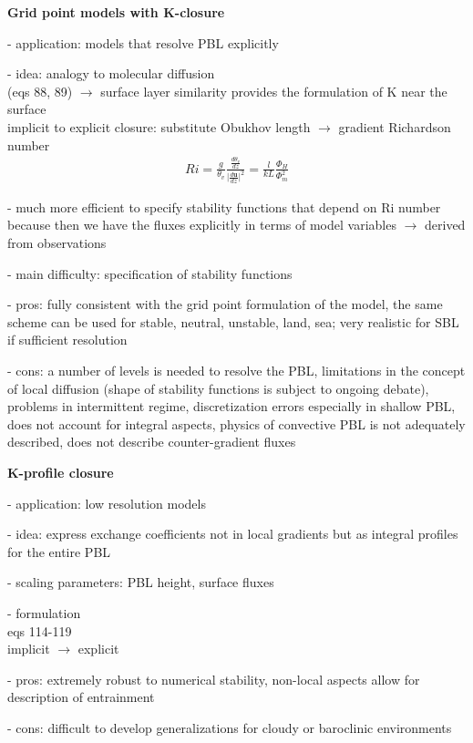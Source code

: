 \documentclass[11pt]{article}
\begin{document}
	\textbf{Grid point models with K-closure} 
	\begin{compactenum}
		\item[-] application: models that resolve PBL explicitly
		\item[-] idea: analogy to molecular diffusion \\ (eqs 88, 89) $\rightarrow$ surface layer similarity provides the formulation of K near the surface \\
		implicit to explicit closure:  substitute Obukhov length $\rightarrow$ gradient Richardson number
		\begin{align}
			Ri = \frac{g}{\theta_v} \frac{\frac{d\theta_v}{dz}}{\vert \frac{d \boldsymbol{u}}{dz} \vert^2} = \frac{l}{kL} \frac{\Phi_H}{\Phi_m^2}	
		\end{align} 
		\item[-] much more efficient to specify stability functions that depend on Ri number because then we have the fluxes explicitly in terms of model variables $\rightarrow$ derived from observations
		\item[-] main difficulty: specification of stability functions
		\item[-] pros: fully consistent with the grid point formulation of the model, the same scheme can be used for stable, neutral, unstable, land, sea; very realistic for SBL if sufficient resolution
		\item[-] cons: a number of levels is needed to resolve the PBL, limitations in the concept of local diffusion (shape of stability functions is subject to ongoing debate), problems in intermittent regime, discretization errors especially in shallow PBL, does not account for integral aspects, physics of convective PBL is not adequately described, does not describe counter-gradient fluxes \\
	\end{compactenum}	

	\textbf{K-profile closure}
	\begin{compactenum}
		\item[-] application: low resolution models
		\item[-] idea: express exchange coefficients not in local gradients but as integral profiles for the entire PBL
		\item[-] scaling parameters: PBL height, surface fluxes
		\item[-] formulation \\
			eqs 114-119 \\
			implicit $\rightarrow$ explicit 
		\item[-] pros: extremely robust to numerical stability, non-local aspects allow for description of entrainment
		\item[-] cons: difficult to develop generalizations for cloudy or baroclinic environments \\
	\end{compactenum}
	
\end{document}
